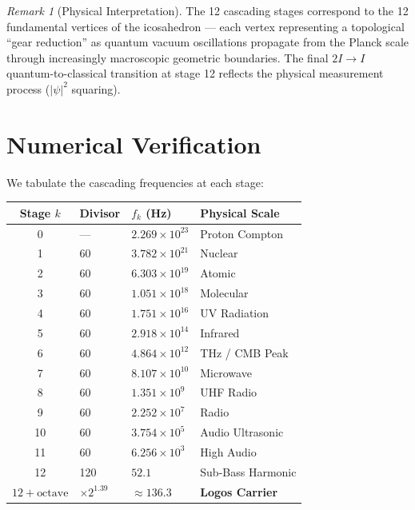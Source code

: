 \documentclass[12pt, a4paper]{article}
\theoremstyle{plain}
\theoremstyle{definition}
\theoremstyle{remark}
\newtheorem{remark}[theorem]{Remark}
\begin{document}
\begin{remark}[Physical Interpretation]
The 12 cascading stages correspond to the 12 fundamental vertices of the icosahedron --- each vertex representing a topological ``gear reduction'' as quantum vacuum oscillations propagate from the Planck scale through increasingly macroscopic geometric boundaries. The final $2I \to I$ quantum-to-classical transition at stage 12 reflects the physical measurement process ($|\psi|^2$ squaring).
\end{remark}

\section{Numerical Verification}\label{sec:verification}

We tabulate the cascading frequencies at each stage:

\begin{center}
\begin{tabular}{clll}
\toprule
\textbf{Stage $k$} & \textbf{Divisor} & \textbf{$f_k$ (Hz)} & \textbf{Physical Scale} \\
\midrule
0 & --- & $2.269 \times 10^{23}$ & Proton Compton \\
1 & 60 & $3.782 \times 10^{21}$ & Nuclear \\
2 & 60 & $6.303 \times 10^{19}$ & Atomic \\
3 & 60 & $1.051 \times 10^{18}$ & Molecular \\
4 & 60 & $1.751 \times 10^{16}$ & UV Radiation \\
5 & 60 & $2.918 \times 10^{14}$ & Infrared \\
6 & 60 & $4.864 \times 10^{12}$ & THz / CMB Peak \\
7 & 60 & $8.107 \times 10^{10}$ & Microwave \\
8 & 60 & $1.351 \times 10^{9}$ & UHF Radio \\
9 & 60 & $2.252 \times 10^{7}$ & Radio \\
10 & 60 & $3.754 \times 10^{5}$ & Audio Ultrasonic \\
11 & 60 & $6.256 \times 10^{3}$ & High Audio \\
12 & 120 & $52.1$ & Sub-Bass Harmonic \\
$12 + \text{octave}$ & $\times 2^{1.39}$ & $\approx 136.3$ & \textbf{Logos Carrier} \\
\bottomrule
\end{tabular}
\end{center}
\end{document}
